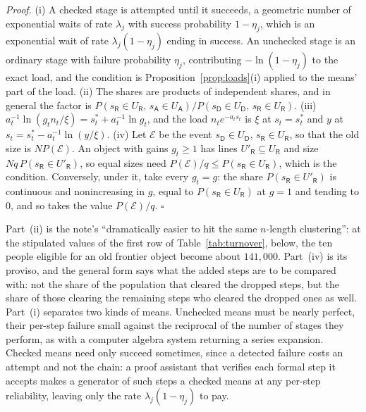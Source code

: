 \documentclass{article}
\begin{document}
\noindent\textit{Proof.} (i) A checked stage is attempted until it succeeds, a geometric number of exponential waits of rate $\lambda_j$ with success probability $1 - \eta_j$, which is an exponential wait of rate $\lambda_j(1 - \eta_j)$ ending in success. An unchecked stage is an ordinary stage with failure probability $\eta_j$, contributing $-\ln(1 - \eta_j)$ to the exact load, and the condition is Proposition~\ref{prop:loads}(i) applied to the means' part of the load. (ii) The shares are products of independent shares, and in general the factor is $P(s_{\mathsf{R}} \in U_{\mathsf{R}},\, s_{\mathsf{A}} \in U_{\mathsf{A}})/P(s_{\mathsf{D}} \in U_{\mathsf{D}},\, s_{\mathsf{R}} \in U_{\mathsf{R}})$. (iii) $a_t^{-1}\ln(g_t n_t/\xi) = s^{\ast}_t + a_t^{-1}\ln g_t$, and the load $n_t e^{-a_t s_t}$ is $\xi$ at $s_t = s^{\ast}_t$ and $y$ at $s_t = s^{\ast}_t - a_t^{-1}\ln(y/\xi)$. (iv) Let $\mathcal{E}$ be the event $s_{\mathsf{D}} \in U_{\mathsf{D}},\, s_{\mathsf{R}} \in U_{\mathsf{R}}$, so that the old size is $N P(\mathcal{E})$. An object with gains $g_t \geq 1$ has lines $U'_{\mathsf{R}} \subseteq U_{\mathsf{R}}$ and size $N q\,P(s_{\mathsf{R}} \in U'_{\mathsf{R}})$, so equal sizes need $P(\mathcal{E})/q \leq P(s_{\mathsf{R}} \in U_{\mathsf{R}})$, which is the condition. Conversely, under it, take every $g_t = g$: the share $P(s_{\mathsf{R}} \in U'_{\mathsf{R}})$ is continuous and nonincreasing in $g$, equal to $P(s_{\mathsf{R}} \in U_{\mathsf{R}})$ at $g = 1$ and tending to $0$, and so takes the value $P(\mathcal{E})/q$. $\square$

Part~(ii) is the note's ``dramatically easier to hit the same $n$-length clustering'': at the stipulated values of the first row of Table~\ref{tab:turnover}, below, the ten people eligible for an old frontier object become about $141{,}000$. Part~(iv) is its proviso, and the general form says what the added steps are to be compared with: not the share of the population that cleared the dropped steps, but the share of those clearing the remaining steps who cleared the dropped ones as well. Part~(i) separates two kinds of means. Unchecked means must be nearly perfect, their per-step failure small against the reciprocal of the number of stages they perform, as with a computer algebra system returning a series expansion. Checked means need only succeed sometimes, since a detected failure costs an attempt and not the chain: a proof assistant that verifies each formal step it accepts makes a generator of such steps a checked means at any per-step reliability, leaving only the rate $\lambda_j(1 - \eta_j)$ to pay.
\end{document}
